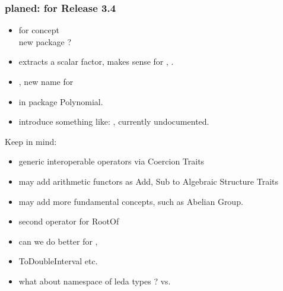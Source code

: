 \subsubsection{planed: for Release 3.4}
\begin{itemize}
\item {} for concept \\
      new package ? 
\item {} extracts a scalar factor, 
      makes sense for , . 
\item {}, new name for 
\item {} in package Polynomial. 
\item introduce something like: , currently undocumented.     
\end{itemize}

Keep in mind: 
\begin{itemize}

\item generic interoperable operators via Coercion Traits
\item may add arithmetic functors as Add, Sub to Algebraic Structure Traits
\item may add more fundamental concepts, such as Abelian Group.
\item second operator for RootOf
\item can we do better for , 
\item ToDoubleInterval etc. 
\item what about namespace of leda types ?  vs. 
\end{itemize}



